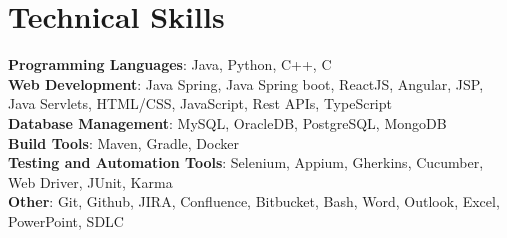 \documentclass[letterpaper,11pt]{article}
\begin{document}
\section{Technical Skills}
 \begin{itemize}[leftmargin=0.15in, label={}]
    \small{\item{
     \textbf{Programming Languages}{: Java, Python, C++, C} \\
    \textbf{Web Development}{: Java Spring, Java Spring boot, ReactJS, Angular, JSP, Java Servlets, HTML/CSS, JavaScript, Rest APIs, TypeScript} \\
    \textbf{Database Management}{: MySQL, OracleDB, PostgreSQL, MongoDB} \\
    \textbf{Build Tools}{: Maven, Gradle, Docker} \\
    \textbf{Testing and Automation Tools}{: Selenium, Appium, Gherkins, Cucumber, Web Driver, JUnit, Karma} \\
    \textbf{Other}{: Git, Github, JIRA, Confluence, Bitbucket, Bash, Word, Outlook, Excel, PowerPoint, SDLC} \\

    }}
 \end{itemize}
\end{document}

